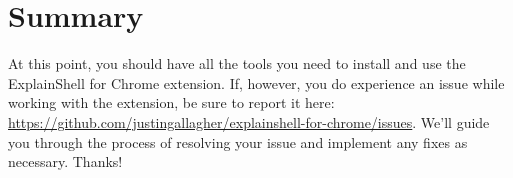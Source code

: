 \documentclass[11pt]{article}
\begin{document}
\section{Summary}
At this point, you should have all the tools you need to install and use the ExplainShell for Chrome extension. If, however, you do experience an issue while working with the extension, be sure to report it here: \url{https://github.com/justingallagher/explainshell-for-chrome/issues}. We'll guide you through the process of resolving your issue and implement any fixes as necessary. Thanks!
\end{document}
